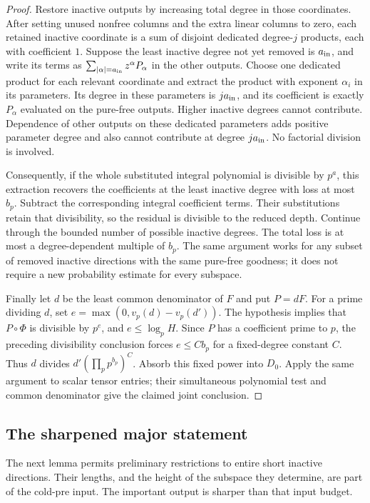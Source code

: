 \begin{proof}
Restore inactive outputs by increasing total degree in those
coordinates.  After setting unused nonfree columns and the extra
linear columns to zero, each retained inactive coordinate is a sum
of disjoint dedicated degree-$j$ products, each with coefficient
$1$.  Suppose the least inactive degree not yet removed is $a_{\rm in}$,
and write its terms as
$\sum_{|\alpha|=a_{\rm in}}z^\alpha P_\alpha$ in the other outputs.
Choose one dedicated product for each relevant coordinate and
extract the product with exponent $\alpha_i$ in its parameters.
Its degree in these parameters is $ja_{\rm in}$, and its coefficient is
exactly $P_\alpha$ evaluated on the pure-free outputs.  Higher
inactive degrees cannot contribute.  Dependence of other outputs
on these dedicated parameters adds positive parameter degree and
also cannot contribute at degree $ja_{\rm in}$.  No factorial division is
involved.

Consequently, if the whole substituted integral polynomial is
divisible by $p^a$, this extraction recovers the coefficients at the
least inactive degree with loss at most $b_p$.  Subtract the
corresponding integral coefficient terms.  Their substitutions
retain that divisibility, so the residual is divisible to the
reduced depth.  Continue through the bounded number of possible
inactive degrees.  The total loss is at most a degree-dependent
multiple of $b_p$.  The same argument works for any subset of
removed inactive directions with the same pure-free goodness; it
does not require a new probability estimate for every subspace.

Finally let $d$ be the least common denominator of $F$ and put
$P=dF$.  For a prime dividing $d$, set
$e=\max(0,v_p(d)-v_p(d'))$.  The hypothesis implies that
$P\circ\Phi$ is divisible by $p^e$, and $e\le\log_p H$.
Since $P$ has a coefficient prime to $p$, the preceding divisibility
conclusion forces $e\le C b_p$ for a fixed-degree constant $C$.
Thus $d$ divides $d'(\prod_p p^{b_p})^C$.  Absorb this fixed power
into $D_0$.  Apply the same argument to scalar tensor entries; their
simultaneous polynomial test and common denominator give the claimed
joint conclusion.
\end{proof}

\subsection{The sharpened major statement}

The next lemma permits preliminary restrictions to entire short
inactive directions.  Their lengths, and the height of the subspace
they determine, are part of the cold-pre input.  The important output
is sharper than that input budget.

